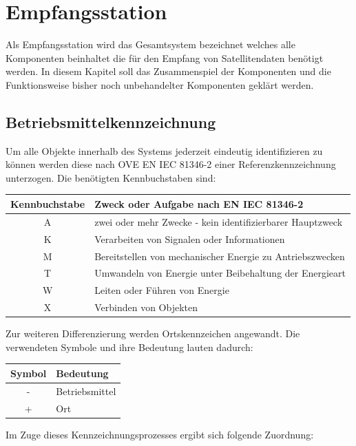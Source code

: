 \chapter{Empfangsstation}
Als Empfangsstation wird das Gesamtsystem bezeichnet welches alle Komponenten beinhaltet die für den Empfang von Satellitendaten benötigt werden. In diesem Kapitel soll das Zusammenspiel der Komponenten und die Funktionsweise bisher noch unbehandelter Komponenten geklärt werden.

\section{Betriebsmittelkennzeichnung}
\label{sec:bmk}
Um alle Objekte innerhalb des Systems jederzeit eindeutig identifizieren zu können werden diese nach OVE EN IEC 81346-2 einer Referenzkennzeichnung unterzogen. Die benötigten Kennbuchstaben sind:

\begin{tabular}{|c|l|}
	\hline
	\textbf{Kennbuchstabe} & \textbf{Zweck oder Aufgabe nach EN IEC 81346-2} \\
	\hline
	A & zwei oder mehr Zwecke - kein identifizierbarer Hauptzweck \\
	\hline
	K & Verarbeiten von Signalen oder Informationen \\
	\hline
	M & Bereitstellen von mechanischer Energie zu Antriebszwecken \\
	\hline
	T & Umwandeln von Energie unter Beibehaltung der Energieart \\
	\hline
	W & Leiten oder Führen von Energie \\
	\hline
	X & Verbinden von Objekten \\
	\hline
\end{tabular}

Zur weiteren Differenzierung werden Ortskennzeichen angewandt. Die verwendeten Symbole und ihre Bedeutung lauten dadurch:

\begin{tabular}{|c|l|}
	\hline
	\textbf{Symbol} & \textbf{Bedeutung} \\
	\hline
	- & Betriebsmittel \\
	\hline
	+ & Ort \\
	\hline
\end{tabular}

Im Zuge dieses Kennzeichnungsprozesses ergibt sich folgende Zuordnung:


